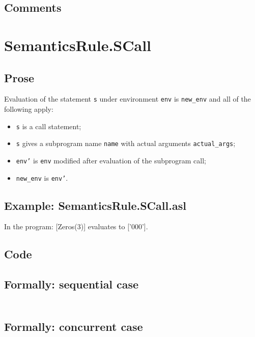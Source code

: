 \documentclass{book}
\begin{document}
  \subsection{Comments}

\section{SemanticsRule.SCall \label{sec:SemanticsRule.SCall}}

    \subsection{Prose}
  Evaluation of the statement \texttt{s} under environment \texttt{env} is
\texttt{new\_env} and all of the following apply:
    \begin{itemize}
    \item \texttt{s} is a call statement;
    \item \texttt{s} gives a subprogram name \texttt{name} with actual arguments \texttt{actual\_args};
    \item \texttt{env'} is \texttt{env} modified after evaluation of the subprogram call;
    \item \texttt{new\_env} is \texttt{env'}.
    \end{itemize}

    \subsection{Example: SemanticsRule.SCall.asl}
    In the program:
    [Zeros(3)] evaluates to ['000'].

  \subsection{Code}

  \subsection{Formally: sequential case}
  \begin{align}
  \end{align} 

  \subsection{Formally: concurrent case}
  \begin{align}
  \end{align} 
\end{document}

